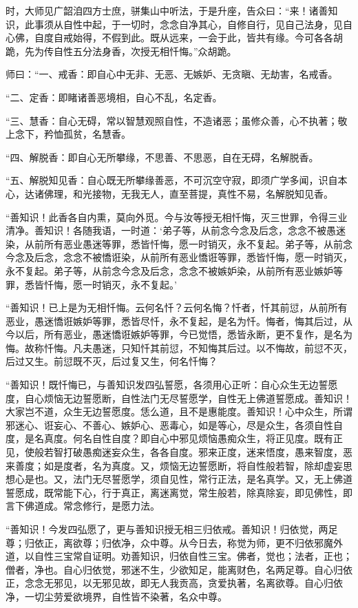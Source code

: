 \documentclass[UTF8, 11pt, oneside]{ctexart}
\begin{document}
时，大师见广韶洎四方士庶，骈集山中听法，于是升座，告众曰：“来！诸善知识，此事须从自性中起，于一切时，念念自净其心，自修自行，见自己法身，见自心佛，自度自戒始得，不假到此。既从远来，一会于此，皆共有缘。今可各各胡跪，先为传自性五分法身香，次授无相忏悔。”众胡跪。

师曰：“一、戒香：即自心中无非、无恶、无嫉妒、无贪瞋、无劫害，名戒香。

“二、定香：即睹诸善恶境相，自心不乱，名定香。

“三、慧香：自心无碍，常以智慧观照自性，不造诸恶；虽修众善，心不执著；敬上念下，矜恤孤贫，名慧香。

“四、解脱香：即自心无所攀缘，不思善、不思恶，自在无碍，名解脱香。

“五、解脱知见香：自心既无所攀缘善恶，不可沉空守寂，即须广学多闻，识自本心，达诸佛理，和光接物，无我无人，直至菩提，真性不易，名解脱知见香。

“善知识！此香各自内熏，莫向外觅。今与汝等授无相忏悔，灭三世罪，令得三业清净。善知识！各随我语，一时道：‘弟子等，从前念今念及后念，念念不被愚迷染，从前所有恶业愚迷等罪，悉皆忏悔，愿一时销灭，永不复起。弟子等，从前念今念及后念，念念不被憍诳染，从前所有恶业憍诳等罪，悉皆忏悔，愿一时销灭，永不复起。弟子等，从前念今念及后念，念念不被嫉妒染，从前所有恶业嫉妒等罪，悉皆忏悔，愿一时销灭，永不复起。’

“善知识！已上是为无相忏悔。云何名忏？云何名悔？忏者，忏其前愆，从前所有恶业，愚迷憍诳嫉妒等罪，悉皆尽忏，永不复起，是名为忏。悔者，悔其后过，从今以后，所有恶业，愚迷憍诳嫉妒等罪，今已觉悟，悉皆永断，更不复作，是名为悔。故称忏悔。凡夫愚迷，只知忏其前愆，不知悔其后过。以不悔故，前愆不灭，后过又生。前愆既不灭，后过复又生，何名忏悔？

“善知识！既忏悔已，与善知识发四弘誓愿，各须用心正听：自心众生无边誓愿度，自心烦恼无边誓愿断，自性法门无尽誓愿学，自性无上佛道誓愿成。善知识！大家岂不道，众生无边誓愿度。恁么道，且不是惠能度。善知识！心中众生，所谓邪迷心、诳妄心、不善心、嫉妒心、恶毒心，如是等心，尽是众生，各须自性自度，是名真度。何名自性自度？即自心中邪见烦恼愚痴众生，将正见度。既有正见，使般若智打破愚痴迷妄众生，各各自度。邪来正度，迷来悟度，愚来智度，恶来善度；如是度者，名为真度。又，烦恼无边誓愿断，将自性般若智，除却虚妄思想心是也。又，法门无尽誓愿学，须自见性，常行正法，是名真学。又，无上佛道誓愿成，既常能下心，行于真正，离迷离觉，常生般若，除真除妄，即见佛性，即言下佛道成。常念修行，是愿力法。

“善知识！今发四弘愿了，更与善知识授无相三归依戒。善知识！归依觉，两足尊；归依正，离欲尊；归依净，众中尊。从今日去，称觉为师，更不归依邪魔外道，以自性三宝常自证明。劝善知识，归依自性三宝。佛者，觉也；法者，正也；僧者，净也。自心归依觉，邪迷不生，少欲知足，能离财色，名两足尊。自心归依正，念念无邪见，以无邪见故，即无人我贡高，贪爱执著，名离欲尊。自心归依净，一切尘劳爱欲境界，自性皆不染著，名众中尊。
\end{document}
